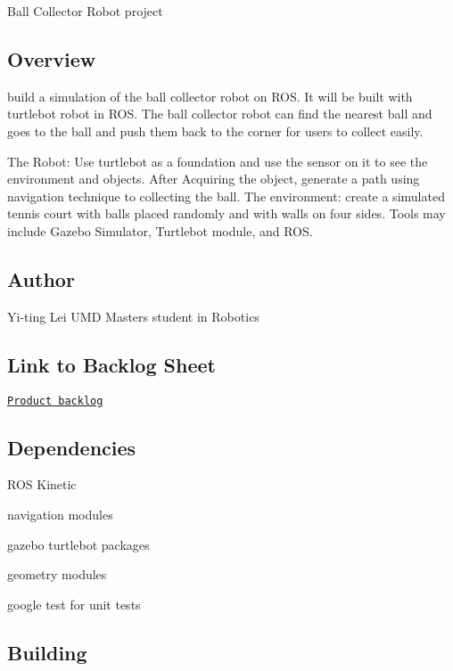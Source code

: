 Ball Collector Robot project

\subsection*{Overview}

build a simulation of the ball collector robot on R\+OS. It will be built with turtlebot robot in R\+OS. The ball collector robot can find the nearest ball and goes to the ball and push them back to the corner for users to collect easily.

The Robot\+: Use turtlebot as a foundation and use the sensor on it to see the environment and objects. After Acquiring the object, generate a path using navigation technique to collecting the ball. The environment\+: create a simulated tennis court with balls placed randomly and with walls on four sides. Tools may include Gazebo Simulator, Turtlebot module, and R\+OS.

\subsection*{Author}

Yi-\/ting Lei U\+MD Masters student in Robotics

\subsection*{Link to Backlog Sheet}

\href{https://docs.google.com/a/umd.edu/spreadsheets/d/1lzo7GK30SF71DnFegieKbuoOMx1Z_jcZFoYa5Z1Lw1A/edit?usp=sharing}{\tt Product backlog}

\subsection*{Dependencies}


\begin{DoxyItemize}
\item R\+OS Kinetic
\item navigation modules
\item gazebo turtlebot packages
\item geometry modules
\item google test for unit tests
\end{DoxyItemize}

\subsection*{Building}


